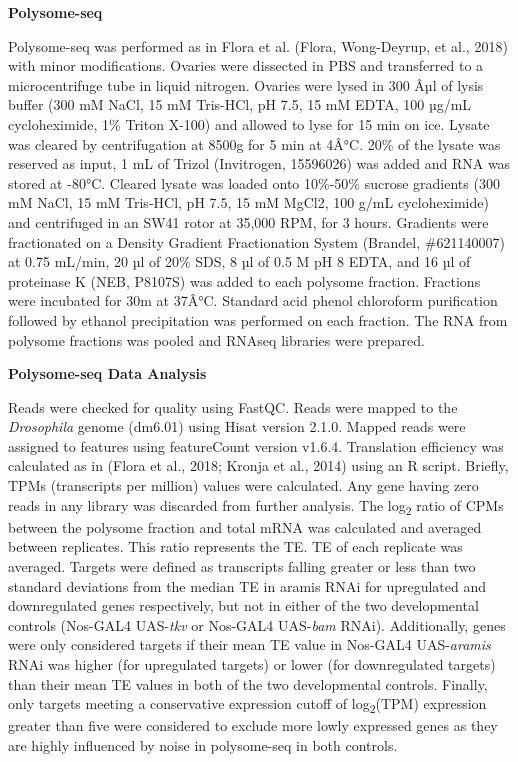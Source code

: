 \documentclass[12pt,oneside]{reedthesis}
\begin{document}
\textbf{Polysome-seq}

Polysome-seq was performed as in Flora et al. (Flora, Wong-Deyrup, et al., 2018) with minor modifications. Ovaries were dissected in PBS and transferred to a microcentrifuge tube in liquid nitrogen. Ovaries were lysed in 300 Âµl of lysis buffer (300 mM NaCl, 15 mM Tris-HCl, pH 7.5, 15 mM EDTA, 100 µg/mL cycloheximide, 1\% Triton X-100) and allowed to lyse for 15 min on ice. Lysate was cleared by centrifugation at 8500g for 5 min at 4Â°C. 20\% of the lysate was reserved as input, 1 mL of Trizol (Invitrogen, 15596026) was added and RNA was stored at -80°C. Cleared lysate was loaded onto 10\%-50\% sucrose gradients (300 mM NaCl, 15 mM Tris-HCl, pH 7.5, 15 mM MgCl2, 100 g/mL cycloheximide) and centrifuged in an SW41 rotor at 35,000 RPM, for 3 hours. Gradients were fractionated on a Density Gradient Fractionation System (Brandel, \#621140007) at 0.75 mL/min, 20 µl of 20\% SDS, 8 µl of 0.5 M pH 8 EDTA, and 16 µl of proteinase K (NEB, P8107S) was added to each polysome fraction. Fractions were incubated for 30m at 37Â°C. Standard acid phenol chloroform purification followed by ethanol precipitation was performed on each fraction. The RNA from polysome fractions was pooled and RNAseq libraries were prepared.

\textbf{Polysome-seq Data Analysis}

Reads were checked for quality using FastQC. Reads were mapped to the \emph{Drosophila} genome (dm6.01) using Hisat version 2.1.0. Mapped reads were assigned to features using featureCount version v1.6.4. Translation efficiency was calculated as in (Flora et al., 2018; Kronja et al., 2014) using an R script. Briefly, TPMs (transcripts per million) values were calculated. Any gene having zero reads in any library was discarded from further analysis. The log\textsubscript{2} ratio of CPMs between the polysome fraction and total mRNA was calculated and averaged between replicates. This ratio represents the TE. TE of each replicate was averaged. Targets were defined as transcripts falling greater or less than two standard deviations from the median TE in aramis RNAi for upregulated and downregulated genes respectively, but not in either of the two developmental controls (Nos-GAL4 UAS-\emph{tkv} or Nos-GAL4 UAS-\emph{bam} RNAi). Additionally, genes were only considered targets if their mean TE value in Nos-GAL4 UAS-\emph{aramis} RNAi was higher (for upregulated targets) or lower (for downregulated targets) than their mean TE values in both of the two developmental controls. Finally, only targets meeting a conservative expression cutoff of log\textsubscript{2}(TPM) expression greater than five were considered to exclude more lowly expressed genes as they are highly influenced by noise in polysome-seq in both controls.
\end{document}
